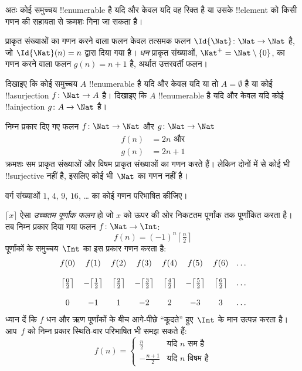 \documentclass[../../../include/open-logic-section]{subfiles}
\begin{document}
\begin{explain}
अतः कोई समुच्चय !!{enumerable} है यदि और केवल यदि वह रिक्त है या उसके
!!{element} को किसी गणन की सहायता से क्रमशः गिना जा सकता है।
\end{explain}

\begin{ex}
प्राकृत संख्याओं का गणन करने वाला फलन केवल तत्समक फलन
$\Id{\Nat} \colon \Nat \to \Nat$ है, जो $\Id{\Nat}(n) = n$ द्वारा दिया
गया है। \emph{धन} प्राकृत संख्याओं, $\Nat^+ =
\Nat \setminus \{0\}$, का
गणन करने वाला फलन $g(n) = n + 1$ है, अर्थात उत्तरवर्ती फलन।
\end{ex}

\begin{prob}
दिखाइए कि कोई समुच्चय $A$ !!{enumerable} है यदि और केवल यदि या तो
$A = \emptyset$ है या कोई !!a{surjection} $f\colon \Nat \to A$ है।
दिखाइए कि $A$ !!{enumerable} है यदि और केवल यदि कोई !!a{injection}
$g\colon A \to \Nat$ है।
\end{prob}

\begin{ex}
निम्न प्रकार दिए गए फलन $f\colon \Nat \to \Nat$ और
$g \colon \Nat \to \Nat$
\begin{align*}
  f(n) & = 2n \text{ और}\\
  g(n) & = 2n+1
\end{align*}
क्रमशः सम प्राकृत संख्याओं और विषम प्राकृत संख्याओं का गणन करते हैं। लेकिन
दोनों में से कोई भी !!{surjective} नहीं है, इसलिए कोई भी~$\Nat$ का गणन नहीं
है।
\end{ex}

\begin{prob}
वर्ग संख्याओं $1$, $4$, $9$, $16$, \dots{} का कोई गणन परिभाषित कीजिए।
\end{prob}

\begin{ex}
$\lceil x \rceil$ ऐसा \emph{उच्चतम पूर्णांक फलन} हो जो $x$ को ऊपर की ओर
निकटतम पूर्णांक तक पूर्णांकित करता है। तब निम्न प्रकार दिया गया फलन
$f \colon \Nat \to \Int$:
\[
  f(n) = (-1)^{n} \left\lceil\tfrac{n}{2}\right\rceil
\]
पूर्णांकों के समुच्चय~$\Int$ का इस प्रकार गणन करता है:
\[
\begin{array}{c c c c c c c c}
f(0) & f(1) & f(2) & f(3) & f(4) & f(5) & f(6) & \dots \\ \\
\big\lceil \tfrac{0}{2} \big\rceil & -\big\lceil \tfrac{1}{2}\big\rceil &  \big\lceil \tfrac{2}{2} \big\rceil & -\big\lceil \tfrac{3}{2} \big\rceil & \big\lceil \tfrac{4}{2} \big\rceil  & -\big\lceil \tfrac{5}{2}\big\rceil & \big\lceil \tfrac{6}{2} \big\rceil & \dots \\ \\
0 & -1 & 1 & -2 & 2 & -3 & 3& \dots
\end{array}
\]
ध्यान दें कि $f$ धन और ऋण पूर्णांकों के बीच आगे-पीछे ``कूदते'' हुए~$\Int$
के मान उत्पन्न करता है। आप~$f$ को निम्न प्रकार स्थिति-वार परिभाषित भी समझ
सकते हैं:
\[
f(n) = \begin{cases}
  \frac{n}{2} & \text{यदि $n$ सम है}\\
  -\frac{n+1}{2} & \text{यदि $n$ विषम है}
  \end{cases}
\]
\end{ex}
\end{document}
